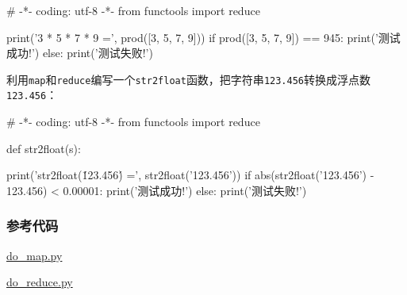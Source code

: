 \begin{pythoncode}
# -*- coding: utf-8 -*-
from functools import reduce
\end{pythoncode}

\begin{pythoncode}
print('3 * 5 * 7 * 9 =', prod([3, 5, 7, 9]))
if prod([3, 5, 7, 9]) == 945:
    print('测试成功!')
else:
    print('测试失败!')
\end{pythoncode}

利用\texttt{map}和\texttt{reduce}编写一个\texttt{str2float}函数，把字符串\texttt{\textquotesingle{}123.456\textquotesingle{}}转换成浮点数\texttt{123.456}：

\begin{pythoncode}
# -*- coding: utf-8 -*-
from functools import reduce

def str2float(s):
\end{pythoncode}

\begin{pythoncode}
print('str2float(\'123.456\') =', str2float('123.456'))
if abs(str2float('123.456') - 123.456) < 0.00001:
    print('测试成功!')
else:
    print('测试失败!')
\end{pythoncode}

\hypertarget{ux53c2ux8003ux4ee3ux7801}{%
\subsubsection{参考代码}\label{ux53c2ux8003ux4ee3ux7801}}

\href{https://github.com/michaelliao/learn-python3/blob/master/samples/functional/do_map.py}{do\_map.py}

\href{https://github.com/michaelliao/learn-python3/blob/master/samples/functional/do_reduce.py}{do\_reduce.py}

